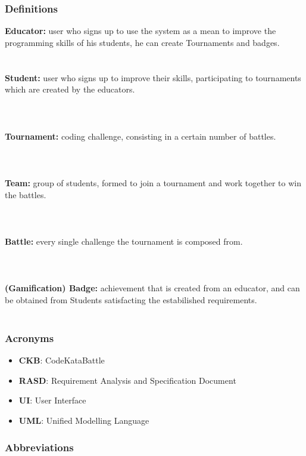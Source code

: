 \documentclass{article}
\begin{document}
\subsubsection{Definitions\\ }
\textbf{Educator:} user who signs up to use the system as a mean to improve the programming skills of his students, he can create Tournaments
and badges.\\\\
\textbf{\\Student:} user who signs up to improve their skills, participating to tournaments which are created by the educators. \\\\\\
\textbf{\\Tournament:} coding challenge, consisting in a certain number of battles.\\\\\\
\textbf{\\Team:} group of students, formed to join a tournament and work together to win the battles.\\\\\\
\textbf{\\Battle:} every single challenge the tournament is composed from. \\\\\\
\textbf{\\(Gamification) Badge:} achievement that is created from an educator, and can be obtained from Students satisfacting the estabilished requirements.\\\\
\textbf{}
\subsubsection{Acronyms}
\begin{itemize}
    \item \textbf{CKB}: CodeKataBattle
    \item \textbf{RASD}: Requirement Analysis and Specification Document
    \item \textbf{UI}: User Interface
    \item \textbf{UML}: Unified Modelling Language
\end{itemize}

\subsubsection{Abbreviations}
\end{document}
